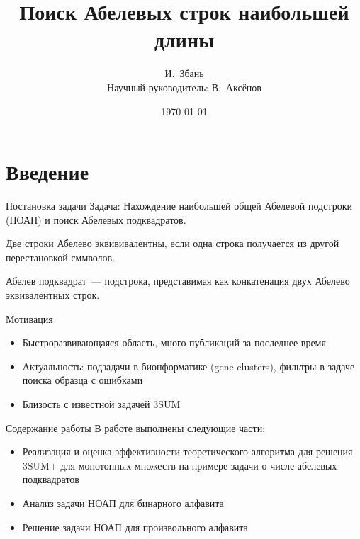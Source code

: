 \documentclass[hyperref=unicode,graphics=pdflatex,12pt]{beamer}
\begin{document}
\title{Поиск Абелевых строк наибольшей длины}
\author{И.~Збань\\
Научный руководитель: В.~Аксёнов}

\date{\today}
\frame{\titlepage}                                   

\section{Введение}

\begin{frame}{Постановка задачи}
\hspace{0.5cm}
Задача: Нахождение наибольшей общей Абелевой подстроки (НОАП) и поиск Абелевых подквадратов.

\vspace{0.5cm}
Две строки Абелево эквививалентны, если одна строка получается из другой перестановкой сммволов.

\vspace{0.5cm}
\hspace{0.5cm}
Абелев подквадрат~--- подстрока, представимая как конкатенация двух Абелево эквивалентных строк.
\end{frame}


\begin{frame}{Мотивация}
\hspace{0.5cm}
\begin{itemize}
\item<1-> Быстроразвивающаяся область, много публикаций за последнее время
\item<2-> Актуальность: подзадачи в бионформатике (gene clusters), фильтры в задаче поиска образца с ошибками
\item<3-> Близость с известной задачей 3SUM
\end{itemize}
\end{frame}

\begin{frame}{Содержание работы}
\hspace{0.5cm}
В работе выполнены следующие части:
\begin{itemize}
\item<1-> Реализация и оценка эффективности теоретического алгоритма для решения 3SUM+
  для монотонных множеств на примере задачи о числе абелевых подквадратов
\item<2-> Анализ задачи НОАП для бинарного алфавита
\item<3-> Решение задачи НОАП для произвольного алфавита
\end{itemize}
\end{frame}
\end{document}
